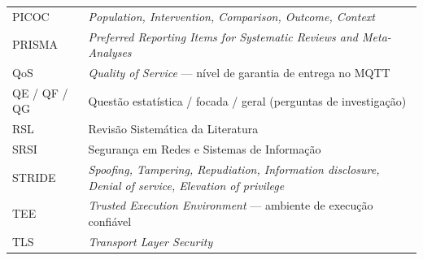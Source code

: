 \begin{longtable}{@{}L{2.6cm}L{12.2cm}@{}}
PICOC  & \emph{Population, Intervention, Comparison, Outcome, Context} \\
PRISMA & \emph{Preferred Reporting Items for Systematic Reviews and Meta-Analyses} \\
QoS    & \emph{Quality of Service} --- nível de garantia de entrega no MQTT \\
QE / QF / QG & Questão estatística / focada / geral (perguntas de investigação) \\
RSL    & Revisão Sistemática da Literatura \\
SRSI   & Segurança em Redes e Sistemas de Informação \\
STRIDE & \emph{Spoofing, Tampering, Repudiation, Information disclosure, Denial of service, Elevation of privilege} \\
TEE    & \emph{Trusted Execution Environment} --- ambiente de execução confiável \\
TLS    & \emph{Transport Layer Security} \\
\bottomrule
\end{longtable}
\addtocounter{table}{-1} %
